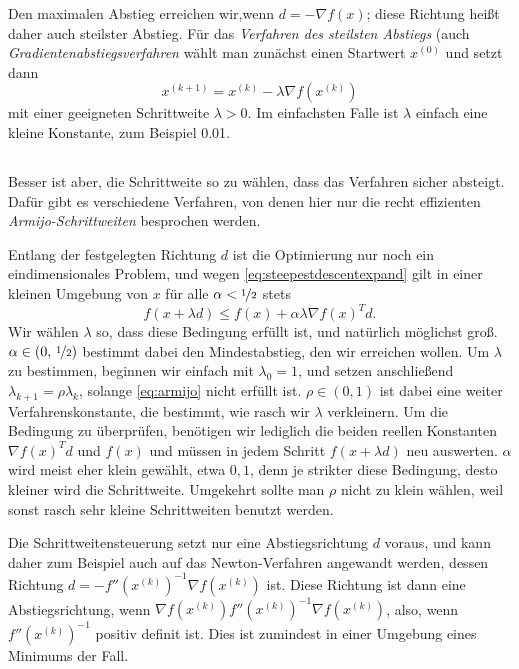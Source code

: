 Den maximalen Abstieg erreichen wir,wenn $d = -\nabla f(x)$; diese
Richtung heißt daher auch steilster Abstieg. Für das \emph{Verfahren
  des steilsten Abstiegs} (auch \emph{Gradientenabstiegsverfahren}
wählt man zunächst einen Startwert $x^{(0)}$ und setzt dann
\begin{equation}
  \label{eq:steepestdescent}
  x^{(k+1)} = x^{(k)} - \lambda \nabla f\left(x^{(k)}\right)
\end{equation}
mit einer geeigneten Schrittweite $\lambda>0$. Im einfachsten Falle
ist $\lambda$ einfach eine kleine Konstante, zum Beispiel 0.01.

\subsection{}

Besser ist aber, die Schrittweite so zu wählen, dass das Verfahren
sicher absteigt. Dafür gibt es verschiedene Verfahren, von denen hier
nur die recht effizienten \emph{Armijo-Schrittweiten} besprochen
werden.

Entlang der festgelegten Richtung $d$ ist die Optimierung nur noch ein
eindimensionales Problem, und wegen \eqref{eq:steepestdescentexpand}
gilt in einer kleinen Umgebung von $x$ für alle
$\alpha<\nicefrac{1}{2}$ stets
\begin{equation}
  \label{eq:armijo}
  f(x + \lambda d) \le f(x) + \alpha\lambda \nabla f(x)^Td.
\end{equation}
Wir wählen $\lambda$ so, dass diese Bedingung erfüllt ist, und
natürlich möglichst groß. $\alpha\in(0,\,\nicefrac{1}{2})$ bestimmt
dabei den Mindestabstieg, den wir erreichen wollen. Um $\lambda$ zu
bestimmen, beginnen wir einfach mit $\lambda_0=1$, und setzen
anschließend $\lambda_{k+1} = \rho\lambda_{k}$, solange
\eqref{eq:armijo} nicht erfüllt ist. $\rho\in (0,1)$ ist dabei eine
weiter Verfahrenskonstante, die bestimmt, wie rasch wir $\lambda$
verkleinern. Um die Bedingung zu überprüfen, benötigen wir lediglich
die beiden reellen Konstanten $\nabla f(x)^Td$ und $f(x)$ und müssen
in jedem Schritt $f(x + \lambda d)$ neu auswerten.  $\alpha$ wird
meist eher klein gewählt, etwa $0,1$, denn je strikter diese
Bedingung, desto kleiner wird die Schrittweite. Umgekehrt sollte man
$\rho$ nicht zu klein wählen, weil sonst rasch sehr kleine
Schrittweiten benutzt werden.

Die Schrittweitensteuerung setzt nur eine Abstiegsrichtung $d$ voraus,
und kann daher zum Beispiel auch auf das Newton-Verfahren angewandt
werden, dessen Richtung $d=-f''\left(x^{(k)}\right)^{-1}\nabla
f\left(x^{(k)}\right)$ ist. Diese Richtung ist dann eine
Abstiegsrichtung, wenn $\nabla f\left(x^{(k)}\right)
f''\left(x^{(k)}\right)^{-1} \nabla f\left(x^{(k)}\right)$, also, wenn
$f''\left(x^{(k)}\right)^{-1}$ positiv definit ist. Dies ist zumindest
in einer Umgebung eines Minimums der Fall.

